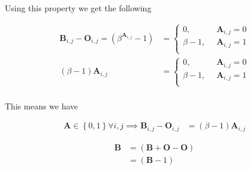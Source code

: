 \documentclass[11pt, twoside]{report}
\begin{document}
Using this property we get the following


\begin{align*}
\mathbf{B}_{i,j}- \mathbf{O}_{i,j} = \left( \beta^{\mathbf{A}_{i,j}} -1 \right) &=
\begin{cases}
    0      , &\enspace \mathbf{A}_{i,j}=0  \\
    \beta-1, &\enspace \mathbf{A}_{i,j}=1  \\
\end{cases} \\
\left( \beta- 1 \right) \mathbf{A}_{i,j} &=
\begin{cases}
    0      , &\enspace \mathbf{A}_{i,j}=0  \\
    \beta-1, &\enspace \mathbf{A}_{i,j}=1  \\
\end{cases} \\
\end{align*}


This means we have


\begin{align*}
\mathbf{A} \in \left\{0, 1\right\} \forall i,j  \implies   \mathbf{B}_{i,j}- \mathbf{O}_{i,j} &= \left( \beta-1 \right) \mathbf{A}_{i,j}
\end{align*}



\begin{align*}
\mathbf{B}&= \left( \mathbf{B}+  \mathbf{O}- \mathbf{O} \right) \\
&= \left( \mathbf{B}- 1 \right)
\end{align*}
\end{document}
